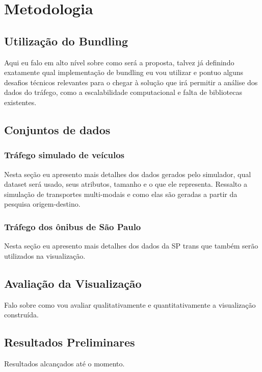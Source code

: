 \chapter{Metodologia}
\label{cap:visualizacao}


\section{Utilização do Bundling}
  Aqui eu falo em alto nível sobre como será a proposta, talvez já definindo exatamente
qual implementação de bundling eu vou utilizar e pontuo alguns desafios técnicos relevantes para o
chegar à solução que irá permitir a análise dos dados do tráfego, como a escalabilidade
computacional e falta de bibliotecas existentes.

\section{Conjuntos de dados}

\subsection{Tráfego simulado de veículos}
  Nesta seção eu apresento mais detalhes dos dados gerados pelo simulador, qual
dataset será usado, seus atributos, tamanho e o que ele representa. Ressalto
a simulação de transportes multi-modais e como elas são geradas a partir da pesquisa origem-destino.

\subsection{Tráfego dos ônibus de São Paulo}
  Nesta seção eu apresento mais detalhes dos dados da SP trans que também serão
utilizados na visualização. 

\section{Avaliação da Visualização}
  Falo sobre como vou avaliar qualitativamente e quantitativamente a visualização
construída. 

\section{Resultados Preliminares}

Resultados alcançados até o momento.

